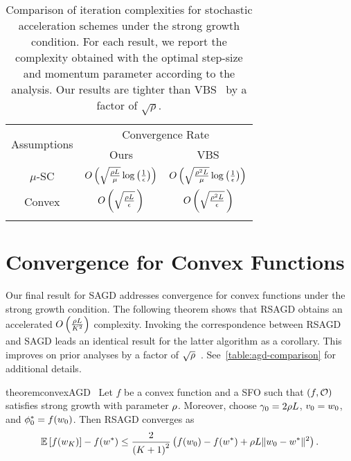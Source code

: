 \begin{table}[t]
    \centering
    \begin{tabular}{c c c  }\toprule
        \multirow{2}{*}{Assumptions} & \multicolumn{2}{c}{Convergence Rate}\\%
        \cmidrule(lr){2-3} 
                 & \multicolumn{1}{c}{Ours} & \multicolumn{1}{c}{VBS}\\ \midrule
        \( \mu \)-SC & \( O\rbr{\sqrt{\frac{\rho L}{\mu}} \log\rbr{\frac{1}{\epsilon}}} \)%
                     & \( O\rbr{\sqrt{\frac{\rho^2 L}{\mu}} \log\rbr{\frac{1}{\epsilon}}} \) \\ \addlinespace
        Convex       & \( O\rbr{\sqrt{\frac{\sgc L}{\epsilon}}\,} \)%
                     & \( O\rbr{\sqrt{\frac{\sgc^2 L}{\epsilon}}\,} \)\\ \addlinespace 
        \end{tabular}
        \caption[Comparison of iteration complexities for stochastic acceleration schemes under strong growth.]%
           {Comparison of iteration complexities for stochastic acceleration schemes under the strong growth condition.
            For each result, we report the complexity obtained with the optimal step-size and momentum parameter according to the analysis.
            Our results are tighter than VBS~\citep{vaswani2019fast} by a factor of \( \sqrt{\rho} \).}%
    \label{table:agd-comparison}
\end{table}

\section{Convergence for Convex Functions}\label{sec:agd-convex}

Our final result for \ac{SAGD} addresses convergence for convex functions under the strong growth condition. 
The following theorem shows that \ac{RSAGD} obtains an accelerated \( O\rbr{\frac{\sgc L}{K^2}} \) complexity.
Invoking the correspondence between \ac{RSAGD} and \ac{SAGD} leads an identical result for the latter algorithm as a corollary.
This improves on prior analyses by a factor of \( \sqrt{\sgc} \)~\citep[Theorem 2]{vaswani2019fast}. 
See~\autoref{table:agd-comparison} for additional details.

\begin{restatable}{theorem}{convexAGD}~\label{thm:convex-agd}
    Let \( f \) be a convex function and \oracle{} a \ac{SFO} such that \( \rbr{f, \oracle{}} \) satisfies strong growth with parameter \( \sgc \).
    Moreover, choose \( \gamma_0 = 2 \sgc L \), \( v_0 = \w_0 \), and \( \phi_0^* = f(\w_0) \).
    Then \ac{RSAGD} converges as  
    \[ \E\sbr{f(\w_K)} - f(\wopt) \leq \frac{2}{\rbr{K+1}^2}\rbr{f(\w_0) - f(\wopt) + \sgc L \norm{\w_0 - \wopt}^2 }. \]
\end{restatable}

